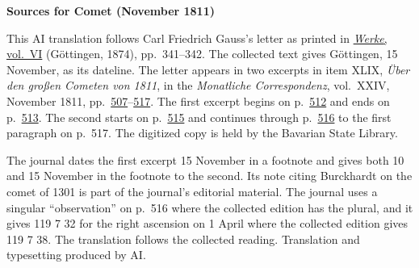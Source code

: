 \clearpage\thispagestyle{empty}
\begin{center}\textbf{Sources for Comet (November 1811)}\end{center}
\noindent This AI translation follows Carl Friedrich Gauss’s letter as printed in \href{https://gdz.sub.uni-goettingen.de/id/PPN236007467}{\textit{Werke}, vol.~VI} (Göttingen, 1874), pp.~341--342. The collected text gives Göttingen, 15 November, as its dateline. The letter appears in two excerpts in item XLIX, \textit{Über den großen Cometen von 1811}, in the \textit{Monatliche Correspondenz}, vol.~XXIV, November 1811, pp.~\href{https://api.digitale-sammlungen.de/iiif/image/v2/bsb10538613_00521/full/1600,/0/default.jpg}{507}--\href{https://api.digitale-sammlungen.de/iiif/image/v2/bsb10538613_00531/full/1600,/0/default.jpg}{517}. The first excerpt begins on p.~\href{https://api.digitale-sammlungen.de/iiif/image/v2/bsb10538613_00526/full/1600,/0/default.jpg}{512} and ends on p.~\href{https://api.digitale-sammlungen.de/iiif/image/v2/bsb10538613_00527/full/1600,/0/default.jpg}{513}. The second starts on p.~\href{https://api.digitale-sammlungen.de/iiif/image/v2/bsb10538613_00529/full/1600,/0/default.jpg}{515} and continues through p.~\href{https://api.digitale-sammlungen.de/iiif/image/v2/bsb10538613_00530/full/1600,/0/default.jpg}{516} to the first paragraph on p.~517. The digitized copy is held by the Bavarian State Library.
\par\smallskip\noindent The journal dates the first excerpt 15 November in a footnote and gives both 10 and 15 November in the footnote to the second. Its note citing Burckhardt on the comet of 1301 is part of the journal’s editorial material. The journal uses a singular “observation” on p.~516 where the collected edition has the plural, and it gives 119 7 32 for the right ascension on 1 April where the collected edition gives 119 7 38. The translation follows the collected reading. Translation and typesetting produced by AI.
\clearpage

